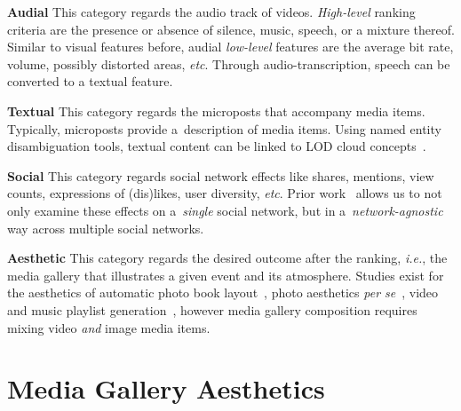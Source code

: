 \documentclass{article}
\let\oldsection\section
\renewcommand{\section}[1]{\oldsection{#1}\vspace{-1em}}
\begin{document}
\noindent \textbf{Audial}
This category regards the audio track of videos.
\emph{High-level} ranking criteria are the presence or absence
of silence, music, speech, or a mixture thereof.
Similar to visual features before,
audial \emph{low-level} features are the average bit rate,
volume, possibly distorted areas, \emph{etc}.
Through audio-transcription, speech can be converted to a textual feature.

\noindent \textbf{Textual}
This category regards the microposts that accompany media items.
Typically, microposts provide a~description of media items.
Using named entity disambiguation tools,
textual content can be linked to LOD cloud concepts~\cite{Facebook2011}.

\noindent \textbf{Social}
This category regards social network effects like shares, mentions,
view counts, expressions of (dis)likes, user diversity, \emph{etc}.
Prior work~\cite{RAMSS2012} allows us to not only examine these effects
on a~\emph{single} social network,
but in a~\emph{network-agnostic} way across multiple social networks.

\noindent \textbf{Aesthetic}
This category regards the desired outcome after the ranking, \emph{i.e.},
the media gallery that illustrates a given event and its atmosphere.
Studies exist for the aesthetics of
automatic photo book layout~\cite{Photo2011},
photo aesthetics \emph{per se}~\cite{Photo2012},
video and music playlist generation~\cite{YouTube2010,Playlist2006},
however media gallery composition requires mixing video
\emph{and} image media items.

\section{Media Gallery Aesthetics}
\end{document}
